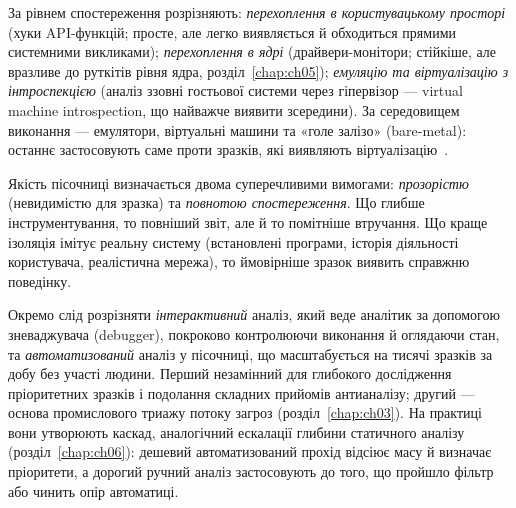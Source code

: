 За рівнем спостереження розрізняють: \emph{перехоплення в користувацькому просторі} (хуки API-функцій; просте, але легко виявляється й обходиться прямими системними викликами); \emph{перехоплення в ядрі} (драйвери-монітори; стійкіше, але вразливе до руткітів рівня ядра, розділ~\ref{chap:ch05}); \emph{емуляцію та віртуалізацію з інтроспекцією} (аналіз ззовні гостьової системи через гіпервізор --- virtual machine introspection, що найважче виявити зсередини). За середовищем виконання --- емулятори, віртуальні машини та «голе залізо» (bare-metal): останнє застосовують саме проти зразків, які виявляють віртуалізацію~\cite{ch07:kirat}.

\begin{tikzfig}
\end{tikzfig}

Якість пісочниці визначається двома суперечливими вимогами: \emph{прозорістю} (невидимістю для зразка) та \emph{повнотою спостереження}. Що глибше інструментування, то повніший звіт, але й то помітніше втручання. Що краще ізоляція імітує реальну систему (встановлені програми, історія діяльності користувача, реалістична мережа), то ймовірніше зразок виявить справжню поведінку.

Окремо слід розрізняти \emph{інтерактивний} аналіз, який веде аналітик за допомогою зневаджувача (debugger), покроково контролюючи виконання й оглядаючи стан, та \emph{автоматизований} аналіз у пісочниці, що масштабується на тисячі зразків за добу без участі людини. Перший незамінний для глибокого дослідження пріоритетних зразків і подолання складних прийомів антианалізу; другий --- основа промислового триажу потоку загроз (розділ~\ref{chap:ch03}). На практиці вони утворюють каскад, аналогічний ескалації глибини статичного аналізу (розділ~\ref{chap:ch06}): дешевий автоматизований прохід відсіює масу й визначає пріоритети, а дорогий ручний аналіз застосовують до того, що пройшло фільтр або чинить опір автоматиці.

